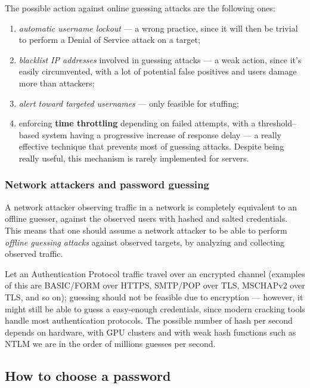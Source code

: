 \documentclass[10pt]{extreport}
\begin{document}
The possible action against online guessing attacks are the following ones:
\begin{enumerate}
    \item \emph{automatic username lockout} --- a wrong practice, since it will
        then be trivial to perform a Denial of Service attack on a target;
    \item \emph{blacklist IP addresses} involved in guessing attacks --- a weak
        action, since it's easily circumvented, with a lot of potential false
        positives and users damage more than attackers;
    \item \emph{alert toward targeted usernames} --- only feasible for stuffing;
    \item enforcing \textbf{time throttling} depending on failed attempts, with
        a threshold\---based system having a progressive increase of response
        delay --- a really effective technique that prevents most of guessing
        attacks. Despite being really useful, this mechanism is rarely
        implemented for servers.
\end{enumerate}

\subsubsection{Network attackers and password guessing}

A network attacker observing traffic in a network is completely equivalent to
an offline guesser, against the observed users with hashed and salted
credentials. This means that one should assume a network attacker to be able to
perform \emph{offline guessing attacks} against observed targets, by analyzing
and collecting observed traffic.

Let an Authentication Protocol traffic travel over an encrypted channel
(examples of this are BASIC/FORM over HTTPS, SMTP/POP over TLS, MSCHAPv2 over
TLS, and so on); guessing should not be feasible due to encryption --- however,
it might still be able to guess a easy\--enough credentials, since modern
cracking tools handle most authentication protocols. The possible number of
hash per second depends on hardware, with GPU clusters and with weak hash
functions such as NTLM we are in the order of millions guesses per second.

\subsection{How to choose a password}
\end{document}
